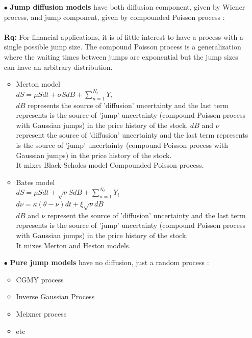 \documentclass[a4paper]{report}
\begin{document}
\begin{itemize}
\begin{itemize}
\item[$\bullet$] \textbf{Jump diffusion models}  have both diffusion component, given by Wiener process, and jump component, given by compounded Poisson process : \\
\\
\textbf{Rq:} For financial applications, it is of little interest to have a process with a single possible jump size. The compound Poisson process is a generalization where the waiting times between jumps are exponential but the jump sizes can have an arbitrary distribution.
\\
\begin{itemize}
\item Merton model\\
$ dS=\mu S dt + \sigma S dB + \sum_{n=1}^{N_t} Y_i$\\
$dB$ represents the source of 'diffusion' uncertainty and the last term represents is the source of 'jump' uncertainty (compound Poisson process with Gaussian jumps) in the price history of the stock. $dB$ and $\nu$ represent the source of 'diffusion' uncertainty and the last term represents is the source of 'jump' uncertainty (compound Poisson process with Gaussian jumps) in the price history of the stock.\\
It mixes Black-Scholes model Compounded Poisson process.\\

\item Bates model\\
$ dS=\mu S dt + \sqrt{\nu} S dB + \sum_{n=1}^{N_t} Y_i$ \\
$ d\nu = \kappa(\theta-\nu)dt +\xi\sqrt{\nu}dB$\\

$dB$ and $\nu$ represent the source of 'diffusion' uncertainty and the last term represents is the source of 'jump' uncertainty (compound Poisson process with Gaussian jumps) in the price history of the stock.\\
It mixes Merton and Heston models.\\

\end{itemize}

\item[$\bullet$] \textbf{Pure jump models} have no diffusion, just a random process : \\
\begin{itemize}
\item CGMY process
\item Inverse Gaussian Process
\item Meixner process
\item etc
\end{itemize}
\end{itemize}


\end{itemize}
\end{document}
